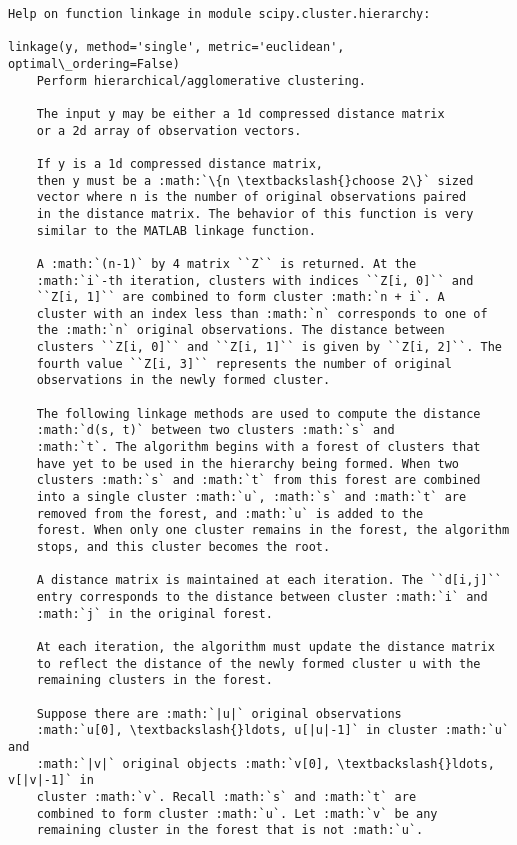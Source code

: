 \documentclass[11pt]{article}
\begin{document}
    \begin{Verbatim}[commandchars=\\\{\}]
Help on function linkage in module scipy.cluster.hierarchy:

linkage(y, method='single', metric='euclidean', optimal\_ordering=False)
    Perform hierarchical/agglomerative clustering.
    
    The input y may be either a 1d compressed distance matrix
    or a 2d array of observation vectors.
    
    If y is a 1d compressed distance matrix,
    then y must be a :math:`\{n \textbackslash{}choose 2\}` sized
    vector where n is the number of original observations paired
    in the distance matrix. The behavior of this function is very
    similar to the MATLAB linkage function.
    
    A :math:`(n-1)` by 4 matrix ``Z`` is returned. At the
    :math:`i`-th iteration, clusters with indices ``Z[i, 0]`` and
    ``Z[i, 1]`` are combined to form cluster :math:`n + i`. A
    cluster with an index less than :math:`n` corresponds to one of
    the :math:`n` original observations. The distance between
    clusters ``Z[i, 0]`` and ``Z[i, 1]`` is given by ``Z[i, 2]``. The
    fourth value ``Z[i, 3]`` represents the number of original
    observations in the newly formed cluster.
    
    The following linkage methods are used to compute the distance
    :math:`d(s, t)` between two clusters :math:`s` and
    :math:`t`. The algorithm begins with a forest of clusters that
    have yet to be used in the hierarchy being formed. When two
    clusters :math:`s` and :math:`t` from this forest are combined
    into a single cluster :math:`u`, :math:`s` and :math:`t` are
    removed from the forest, and :math:`u` is added to the
    forest. When only one cluster remains in the forest, the algorithm
    stops, and this cluster becomes the root.
    
    A distance matrix is maintained at each iteration. The ``d[i,j]``
    entry corresponds to the distance between cluster :math:`i` and
    :math:`j` in the original forest.
    
    At each iteration, the algorithm must update the distance matrix
    to reflect the distance of the newly formed cluster u with the
    remaining clusters in the forest.
    
    Suppose there are :math:`|u|` original observations
    :math:`u[0], \textbackslash{}ldots, u[|u|-1]` in cluster :math:`u` and
    :math:`|v|` original objects :math:`v[0], \textbackslash{}ldots, v[|v|-1]` in
    cluster :math:`v`. Recall :math:`s` and :math:`t` are
    combined to form cluster :math:`u`. Let :math:`v` be any
    remaining cluster in the forest that is not :math:`u`.
    

\end{Verbatim}
\end{document}
